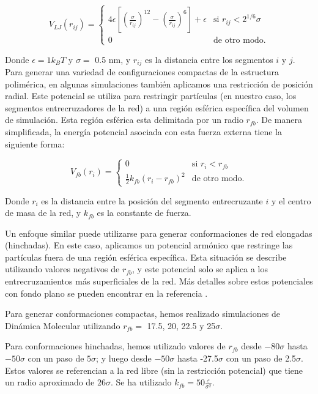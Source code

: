 \begin{equation}
	V_{LJ}(r_{ij})=\begin{cases}
		4\epsilon \left[\left(\frac{\sigma}{r_{ij}}\right)^{12} - \left(\frac{\sigma}{r_{ij}}\right)^{6}\right] + \epsilon & \text{si $r_{ij} < 2^{1/6}\sigma$}\\
		0 & \text{de otro modo}.
	\end{cases}
\end{equation}



Donde $\epsilon = 1 k_BT$ y $\sigma = $ 0.5 nm, y $r_{ij}$ es la distancia entre los segmentos $i$ y $j$.
Para generar una variedad de configuraciones compactas de la estructura polim\'erica, en algunas simulaciones tambi\'en aplicamos una restricci\'on de posici\'on radial.
Este potencial se utiliza para restringir part\'iculas (en nuestro caso, los segmentos entrecruzadores de la red) a una regi\'on esf\'erica espec\'ifica del volumen de simulaci\'on.
Esta regi\'on esf\'erica esta delimitada por un radio $r_{fb}$.
De manera simplificada, la energ\'ia potencial asociada con esta fuerza externa tiene la siguiente forma:

\begin{equation}
	V_{fb}(r_i)=\begin{cases}
		0 & \text{si $r_{i} < r_{fb}$}\\
		\frac{1}{2}k_{fb}\left(r_i -r_{fb}\right)^2 & \text{de otro modo}.
	\end{cases}
\end{equation}


Donde $r_i$ es la distancia entre la posici\'on del segmento entrecruzante $i$ y el centro de masa de la red, y $k_{fb}$ es la constante de fuerza.

Un enfoque similar puede utilizarse para generar conformaciones de red elongadas (hinchadas). En este caso, aplicamos un potencial arm\'onico que restringe las part\'iculas fuera de una regi\'on esf\'erica espec\'ifica. Esta situaci\'on se describe utilizando valores negativos de $r_{fb}$, y este potencial solo se aplica a los entrecruzamientos m\'as superficiales de la red. M\'as detalles sobre estos potenciales con fondo plano se pueden encontrar en la referencia \cite{GROMACSRestraints}.

Para generar conformaciones compactas, hemos realizado simulaciones de Din\'amica Molecular utilizando $r_{fb} =$ 17.5, 20, 22.5 y 25$\sigma$.

Para conformaciones hinchadas, hemos utilizado valores de $r_{fb}$ desde $-80\sigma$ hasta $-50\sigma$ con un paso de $5\sigma$; y luego desde $-50\sigma$ hasta -27.5$\sigma$ con un paso de 2.5$\sigma$. Estos valores se referencian a la red libre (sin la restricci\'on potencial) que tiene un radio aproximado de $26\sigma$.
Se ha utilizado $k_{fb} = 50\frac{\varepsilon}{\sigma^2} $.



